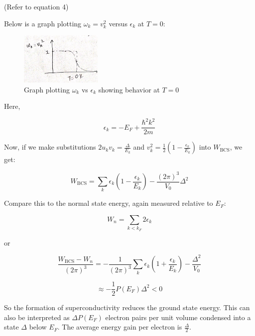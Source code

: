 \documentclass{article}
\begin{document}
(Refer to equation 4)

Below is a graph plotting \( \omega_k = v_k^2 \) versus \( \epsilon_k \) at \( T = 0 \):

\begin{figure}[!htbp]
        \includegraphics[width=0.35\textwidth]{figures/epsilon_k.png}
    \caption{Graph plotting \( \omega_k \) vs \( \epsilon_k \) showing behavior at \( T = 0 \) }\label{fig:}
\end{figure}

Here,

\[
\epsilon_k = -E_F + \frac{\hbar^2 k^2}{2m}
\]

Now, if we make substitutions \( 2u_k v_k = \frac{\Delta}{E_k} \) and \( v_k^2 = \frac{1}{2} \left( 1 - \frac{\epsilon_k}{E_k} \right) \) into \( W_{\text{BCS}} \), we get:

\[
W_{\text{BCS}} = \sum_k \epsilon_k \left( 1 - \frac{\epsilon_k}{E_k} \right) - \frac{(2\pi)^3}{V_0} \Delta^2
\]

Compare this to the normal state energy, again measured relative to \( E_F \):

\[
W_n = \sum_{k < k_F} 2\epsilon_k
\]

or

\[
\frac{W_{\text{BCS}} - W_n}{(2\pi)^3} = - \frac{1}{(2\pi)^3} \sum_k \epsilon_k \left( 1 + \frac{\epsilon_k}{E_k} \right) - \frac{\Delta^2}{V_0}
\]

\[
\approx - \frac{1}{2} P(E_F) \Delta^2 < 0
\]

So the formation of superconductivity reduces the ground state energy. This can also be interpreted as \( \Delta P(E_F) \) electron pairs per unit volume condensed into a state \( \Delta \) below \( E_F \). The average energy gain per electron is \( \frac{\Delta}{2} \).
\end{document}
